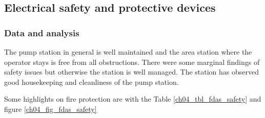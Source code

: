 \subsection{Electrical safety and protective devices} \label{ch04fdas04}
\subsubsection{Data and analysis}
The pump station in general is well maintained and the area station where the operator stays is free from all obstructions. There were some marginal findings of safety issues but otherwise the station is well managed. The station has observed good housekeeping and cleanliness of the pump station.

Some highlights on fire protection are with the Table \ref{ch04_tbl_fdas_safety} and figure \ref{ch04_fig_fdas_safety}













